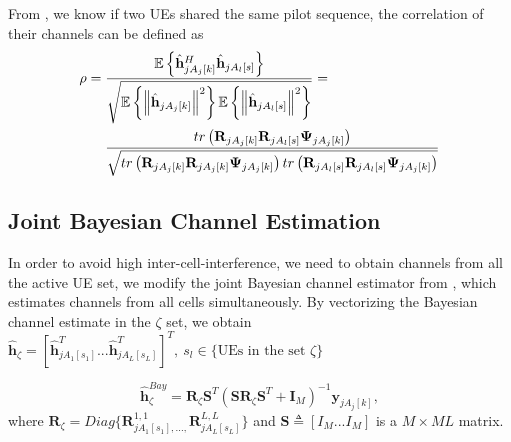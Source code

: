 From \cite{bjornson2017massive}, we know if two UEs shared the same pilot sequence, the correlation of their channels can be defined as
\begin{equation}
\begin{split}
\rho={} &
\frac{\operatorname{\mathbb{E}}\left\{ \hat{\mathbf{h}}_{jA_{j}[k]}^{H}\hat{\mathbf{h}}_{jA_{l}[s]}\right\} }{\sqrt{\operatorname{\mathbb{E}}\left\{ \left\Vert \hat{\mathbf{h}}_{jA_{j}[k]}\right\Vert ^{2}\right\} \operatorname{\mathbb{E}}\left\{ \left\Vert \hat{\mathbf{h}}_{jA_{l}[s]}\right\Vert ^{2}\right\} }}=\\
& \frac{tr\left(\mathbf{R}_{jA_{j}[k]}\mathbf{R}_{jA_{l}[s]}\mathbf{\Psi}_{jA_{j}[k]}\right)}{\sqrt{tr\left(\mathbf{R}_{jA_{j}[k]}\mathbf{R}_{jA_{j}[k]}\mathbf{\Psi}_{jA_{j}[k]}\right)tr\left(\mathbf{R}_{jA_{l}[s]}\mathbf{R}_{jA_{l}[s]}\mathbf{\Psi}_{jA_{j}[k]}\right)}}
\end{split}
\end{equation}

\subsection{Joint Bayesian Channel Estimation}
In order to avoid high inter-cell-interference, we need to obtain channels from all the active UE set, we modify the joint Bayesian channel estimator from \cite{yin2013coordinated}, which estimates channels from all cells simultaneously. By vectorizing the Bayesian channel estimate in the $\zeta$ set, we obtain $\hat{\mathbf{h}}_{\zeta}=[\hat{\mathbf{h}}_{jA_{1}[s_{1}]}^{T}...\hat{\mathbf{h}}_{jA_{L}[s_{L}]}^{T}]^{T},\:s_{l}\in \{\text{UEs in the set } \zeta\}$ 

\begin{equation}
\hat{\mathbf{h}}_{\zeta}^{Bay}=\mathbf{R}_{\zeta}\mathbf{S}^{T}%
(\mathbf{S}\mathbf{R}_{\zeta}\mathbf{S}^{T}+\mathbf{I}_{M})^{-1}\mathbf{y}_{jA_{j}[k]},
\end{equation}
where $\mathbf{R}_{\zeta}=Diag\{\mathbf{R}^{1,1}_{jA_{1}[s_{1}],...,}\mathbf{R}^{L,L}_{jA_{L}[s_{L}]}\} $ and %
$\mathbf{S}\triangleq[I_{M}...I_{M}]$ is a $M\times ML$ matrix.





